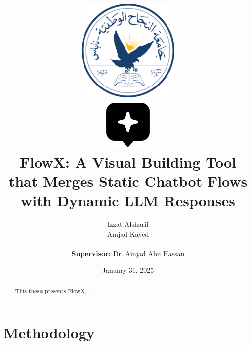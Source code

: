 \documentclass[12pt, a4paper]{report}
\title{
    \includegraphics[height=5cm]{assets/NNU_Logo.png} \\[1cm]
    \includegraphics[height=2.5cm]{assets/FlowX_Logo.png} \\[1cm]
    FlowX: A Visual Building Tool that Merges Static Chatbot Flows with Dynamic LLM Responses
}
\author{
    Izzat Alsharif \\
    Amjad Kayed
    \\\\
    \textbf{Supervisor:} Dr. Amjad Abu Hassan
}
\date{January 31, 2025}
\begin{document}
\maketitle
\tableofcontents
\listoffigures
\listoftables

\begin{abstract}
This thesis presents FlowX, ...
\end{abstract}






\chapter{Methodology}









\renewcommand{\bibname}{References}


\end{document}
